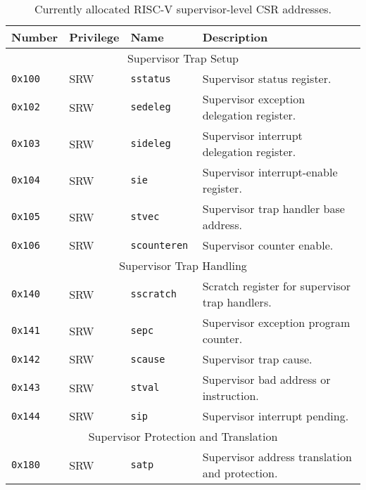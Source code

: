 \begin{table}[htb!]
\begin{center}
\begin{tabular}{|l|l|l|l|}
\hline
Number    & Privilege & Name & Description \\
\hline
\multicolumn{4}{|c|}{Supervisor Trap Setup} \\
\hline
\tt 0x100 & SRW  &\tt sstatus    & Supervisor status register. \\
\tt 0x102 & SRW  &\tt sedeleg    & Supervisor exception delegation register. \\
\tt 0x103 & SRW  &\tt sideleg    & Supervisor interrupt delegation register. \\
\tt 0x104 & SRW  &\tt sie        & Supervisor interrupt-enable register. \\
\tt 0x105 & SRW  &\tt stvec      & Supervisor trap handler base address. \\
\tt 0x106 & SRW  &\tt scounteren & Supervisor counter enable. \\
\hline
\multicolumn{4}{|c|}{Supervisor Trap Handling} \\
\hline
\tt 0x140 & SRW  &\tt sscratch   & Scratch register for supervisor trap handlers. \\
\tt 0x141 & SRW  &\tt sepc       & Supervisor exception program counter. \\
\tt 0x142 & SRW  &\tt scause     & Supervisor trap cause. \\
\tt 0x143 & SRW  &\tt stval      & Supervisor bad address or instruction. \\
\tt 0x144 & SRW  &\tt sip        & Supervisor interrupt pending. \\
\hline
\multicolumn{4}{|c|}{Supervisor Protection and Translation} \\
\hline
\tt 0x180 & SRW  &\tt satp       & Supervisor address translation and protection. \\
\hline
\end{tabular}
\end{center}
\caption{Currently allocated RISC-V supervisor-level CSR addresses.}
\label{scsrnames}
\end{table}

